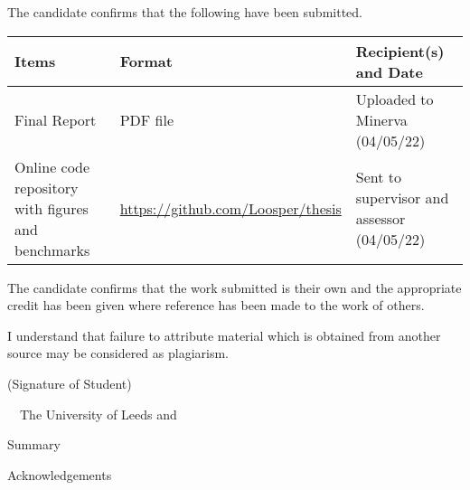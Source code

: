 \frontcover

\clearpage

\noindent The candidate confirms that the following have been submitted.\\


\begin{table}[ht!]
\begin{tabular}{|p{}|p{}|p{}|}
\hline
    Items & Format & Recipient(s) and Date \\
\hline
    Final Report & PDF file & Uploaded to Minerva (04/05/22) \\
\hline
    Online code repository with figures and benchmarks &
    \url{https://github.com/Loosper/thesis} &
    Sent to supervisor and assessor (04/05/22) \\
\hline
\end{tabular}
\end{table}


\vfill

\noindent The candidate confirms that the work submitted is their own and the appropriate credit has been given where reference has been made to the work of others.

\vfill

\noindent I understand that failure to attribute material which is obtained from another source may be considered as plagiarism.

\vfill

\begin{flushright}
    (Signature of Student) \fullname
\end{flushright}

\vfill

\textcopyright~\session~The University of Leeds and~\fullname

\setlength{\parindent}{11pt}

\begin{metachapter}{Summary}

\end{metachapter}

\begin{metachapter}{Acknowledgements}
    
\end{metachapter}

\tableofcontents

\listoffigures

\clearpage
{}

